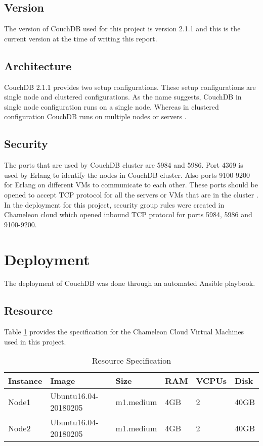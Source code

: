 \subsection{Version}
The version of CouchDB used for this project is version 2.1.1 and this
is the current version at the time of writing this report.

\subsection{Architecture}
CouchDB 2.1.1 provides two setup configurations. These setup
configurations are single node and clustered configurations. As the
name suggests, CouchDB in single node configuration runs on a single
node. Whereas in clustered configuration CouchDB runs on multiple
nodes or servers \cite{www-Couchdb, www-CouchdbOverview}.

\subsection{Security}
The ports that are used by CouchDB cluster are 5984 and 5986. Port
4369 is used by Erlang to identify the nodes in CouchDB cluster. Also
ports 9100-9200 for Erlang on different VMs to communicate to each
other. These ports should be opened to accept TCP protocol for all the
servers or VMs that are in the cluster \cite{www-CouchdbSetup}. 
In the deployment for this project, security group rules were
created in Chameleon cloud which opened inbound TCP protocol for ports
5984, 5986 and 9100-9200.


\section{Deployment}
The deployment of CouchDB  was done through an automated Ansible
playbook. 
\subsection{Resource}
Table \ref{t:resource-specification} provides the specification for
the Chameleon Cloud Virtual Machines used in this project.

\begin{table}[]
\centering
\caption{Resource Specification}
\label{t:resource-specification}
\begin{tabular}{|l|l|l|l|l|l|}
\hline
\textbf{Instance} & \textbf{Image}       & \textbf{Size} & \textbf{RAM} & \textbf{VCPUs} & \textbf{Disk} \\ \hline
Node1             & Ubuntu16.04-20180205 & m1.medium     & 4GB          & 2              & 40GB          \\ \hline
Node2             & Ubuntu16.04-20180205 & m1.medium     & 4GB          & 2              & 40GB          \\ \hline
\end{tabular}
\end{table}

